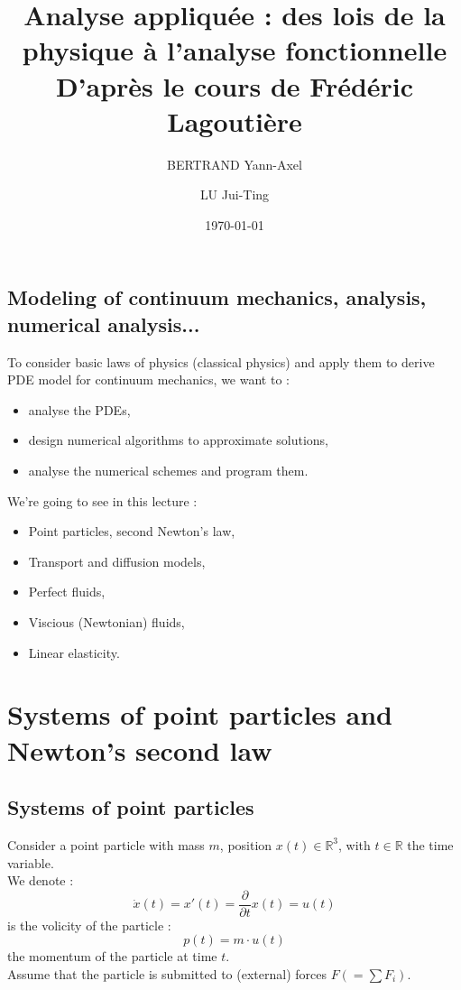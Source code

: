 \documentclass{report}
\title{Analyse appliquée : des lois de la physique à l’analyse fonctionnelle \\ 
	\vspace{2cm} D'après le cours de Frédéric Lagoutière}
\author{
  BERTRAND Yann-Axel  \and
  LU Jui-Ting   
}
\date{\today}
\theoremstyle{plain}
\theoremstyle{definition}
\theoremstyle{remark}
\begin{document}
\maketitle
\section*{Modeling of continuum mechanics, analysis, numerical analysis... } 
To consider basic laws of physics (classical physics) and apply them to derive PDE model for continuum mechanics, we want to :
\begin{itemize}
\item analyse the PDEs,
\item design numerical algorithms to approximate solutions,
\item analyse the numerical schemes and program them.
\end{itemize}
We're going to see in this lecture :
\begin{itemize}
\item Point particles, second Newton's law,
\item Transport and diffusion models,
\item Perfect fluids,
\item Viscious (Newtonian) fluids,
\item Linear elasticity.
\end{itemize}
\renewcommand{\contentsname}{Table des matières}
\tableofcontents
\chapter{Systems of point particles and Newton's second law}
\section{Systems of point particles}
Consider a point particle with mass $m$, position $x(t) \in \mathbb{R}^3$, with $t \in \mathbb{R}$ the time variable. \\
We denote : \begin{equation}
\dot{x}(t)=x'(t)=\frac{\partial}{\partial t}x(t) = u(t)
\end{equation}
is the volicity of the particle : \begin{equation}
p(t) = m\cdot u(t)
\end{equation} the momentum of the particle at time $t$.\\
Assume that the particle is submitted to (external) forces $F \left( = \sum F_i \right)$.
\end{document}
